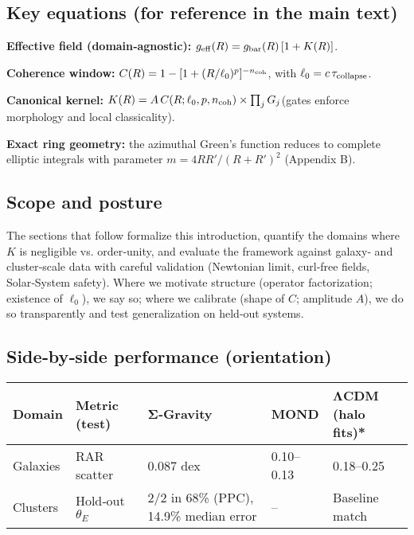 \documentclass[11pt,a4paper]{article}
\begin{document}
\subsection{Key equations (for reference in the main text)}


\textbf{Effective field (domain‑agnostic):} $\allowbreak g_{\rm eff}(R) = g_{\rm bar}(R)\,[1 + K(R)]$\allowbreak .


\textbf{Coherence window:} $\allowbreak C(R) = 1 - [1 + (R/\ell_0)^p]^{-n_{\rm coh}}$\allowbreak , with $\allowbreak \ell_0 = c\,\tau_{\rm collapse}$\allowbreak .


\textbf{Canonical kernel:} $\allowbreak K(R) = A\,C(R;\ell_0,p,n_{\rm coh}) \times \prod_j G_j$\allowbreak  (gates enforce morphology and local classicality).


\textbf{Exact ring geometry:} the azimuthal Green's function reduces to complete elliptic integrals with parameter $m = 4RR'/(R+R')^2$ (Appendix B).


\subsection{Scope and posture}


The sections that follow formalize this introduction, quantify the domains where $K$ is negligible vs. order‑unity, and evaluate the framework against galaxy‑ and cluster‑scale data with careful validation (Newtonian limit, curl‑free fields, Solar‑System safety). Where we motivate structure (operator factorization; existence of $\ell_0$), we say so; where we calibrate (shape of $C$; amplitude $A$), we do so transparently and test generalization on held‑out systems.


\subsection{Side‑by‑side performance (orientation)}


\begin{table}[h]
\centering
\begin{tabular}{lllll}
\toprule
Domain & Metric (test) & Σ‑Gravity & MOND & ΛCDM (halo fits)* \\
\midrule
Galaxies & RAR scatter & 0.087 dex & 0.10–0.13 & 0.18–0.25 \\
Clusters & Hold‑out $\theta_E$ & 2/2 in 68\% (PPC), 14.9\% median error & – & Baseline match \\
\bottomrule
\end{tabular}
\end{table}
\end{document}
